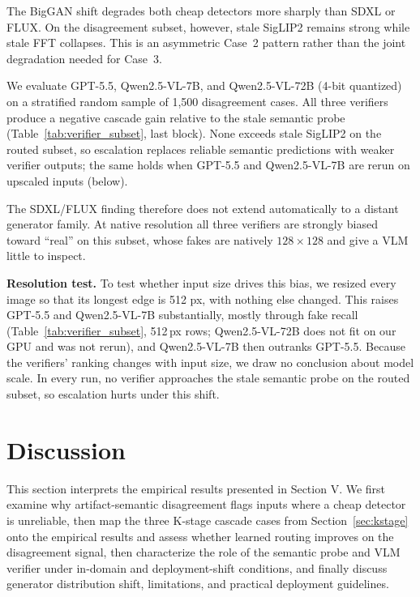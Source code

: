 \documentclass{ieeeaccess}
\begin{document}
The BigGAN shift degrades both cheap detectors more sharply than SDXL or FLUX. On the
disagreement subset, however, stale SigLIP2 remains strong while stale FFT collapses.
This is an asymmetric Case~2 pattern rather than the joint degradation needed for
Case~3.

We evaluate GPT-5.5, Qwen2.5-VL-7B, and Qwen2.5-VL-72B (4-bit quantized) on a
stratified random sample of 1{,}500 disagreement cases. All three verifiers produce a 
negative cascade gain relative to the stale semantic probe (Table~\ref{tab:verifier_subset}, last block).
None exceeds stale SigLIP2 on the routed subset, so escalation replaces reliable
semantic predictions with weaker verifier outputs; the same holds when GPT-5.5 and
Qwen2.5-VL-7B are rerun on upscaled inputs (below). 

The SDXL/FLUX finding therefore does not extend automatically to a distant generator family. At native resolution all three verifiers are strongly biased toward ``real'' on this subset, whose fakes are natively $128{\times}128$ and give a VLM little to inspect.

\textbf{Resolution test.} To test whether input size drives this bias, we resized every image so that its longest edge is 512 px, with nothing else changed. This raises GPT-5.5 and Qwen2.5-VL-7B substantially, mostly through fake recall (Table~\ref{tab:verifier_subset}, 512\,px rows; Qwen2.5-VL-72B does not fit on our GPU and was not rerun), and Qwen2.5-VL-7B then outranks GPT-5.5. Because the verifiers' ranking changes with input size, we draw no conclusion about model scale. In every run, no verifier approaches the stale semantic probe on the routed subset, so escalation hurts under this shift.

\section{Discussion}
\label{sec:discussion}

This section interprets the empirical results presented in Section V. We first examine
why artifact-semantic disagreement flags inputs where a cheap detector is unreliable, then map the
three K-stage cascade cases from Section~\ref{sec:kstage} onto the empirical results and assess whether
learned routing improves on the disagreement signal, then characterize the role of the
semantic probe and VLM verifier under in-domain and deployment-shift conditions, and
finally discuss generator distribution shift, limitations, and practical deployment
guidelines.
\end{document}
